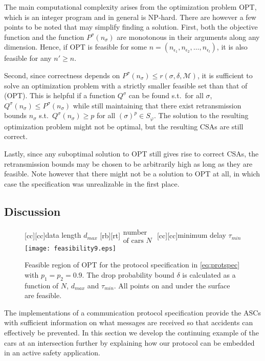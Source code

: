 \documentclass{sig-alternate}
\renewcommand{\v}{\varphi}
\newcommand{\e}{\epsilon}
\renewcommand{\d}{\delta}
\newcommand{\M}{\mathcal{M}}
\newcommand{\figvspace}{\vspace{-0.2in}}
\newcommand{\figsmallvspace}{\vspace{-0.1in}}
\begin{document}
The main computational complexity arises from the optimization problem OPT, which is an integer program and in general is NP-hard. There are however a few points to be noted that may simplify finding a solution. First, both the objective function and the function $P^{\sigma}(n_{\sigma})$ are monotonous in their arguments along any dimension. Hence, if OPT is feasible for some $n = (n_{\e_1}, n_{\e_2}, \ldots, n_{\e_l})$, it is also feasible for any $n' \geq n$.

Second, since correctness depends on $P^{\sigma}(n_{\sigma}) \leq r(\sigma, \delta, \M)$, it is sufficient to solve an optimization problem with a strictly smaller feasible set than that of (OPT). This is helpful if a function $Q^{\sigma}$ can be found s.t.\ for all $\sigma$, $Q^{\sigma}(n_{\sigma}) \leq P^{\sigma}(n_{\sigma})$ while still maintaining that there exist retransmission bounds $n_{\sigma}$ s.t.\ $Q^{\sigma}(n_{\sigma}) \geq p$ for all $(\sigma)^p \in S_\v$. The solution to the resulting optimization problem might not be optimal, but the resulting CSAs are still correct.

Lastly, since any suboptimal solution to OPT still gives rise to correct CSAs,  the retransmission bounds may be chosen to be arbitrarily high as long as they are feasible. Note however that there might not be a solution to OPT at all, in which case the specification was unrealizable in the first place.


\subsection{Discussion} \label{sec:validity}

\begin{figure}
\centering
	[cc][cc]{data length $d_{max}$}
	[rb][rt]{$\begin{array}{l}\text{number}\\\text{of cars $N$}\end{array}$}
	[cc][cc]{minimum delay $\tau_{min}$}
	\texttt{[image: feasibility9.eps]}
\figsmallvspace
\caption{Feasible region of OPT for the protocol specification in \eqref{eq:protspec} with $p_1 = p_2 = 0.9$. The drop probability bound $\d$ is calculated as a function of $N$, $d_{max}$ and $\tau_{min}$. All points on and under the surface are feasible.}
\label{fig:feasibility6}
\figvspace
\end{figure}

The implementations of a communication protocol specification provide the ASCs with sufficient information on what messages are received so that accidents can effectively be prevented. In this section we develop the continuing example of the cars at an intersection further by explaining how our protocol can be embedded in an active safety application.
\end{document}
